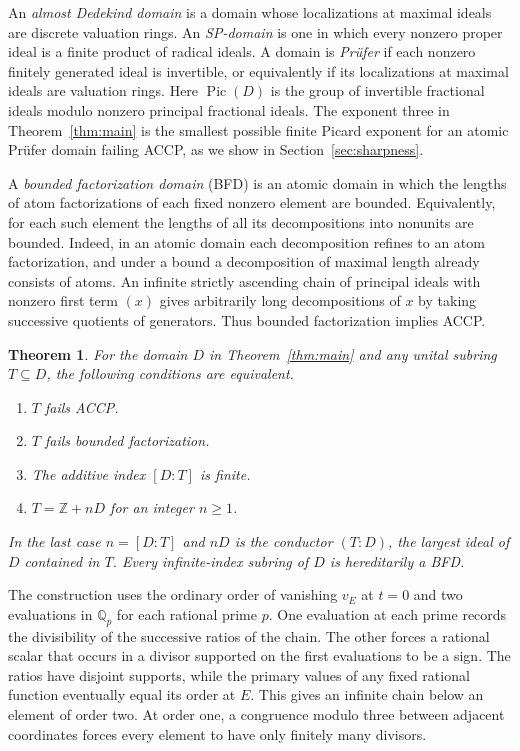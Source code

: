 \documentclass[11pt, letterpaper]{article}
\newtheorem{maintheorem}{Theorem}
\theoremstyle{definition}
\theoremstyle{remark}
\begin{document}
An \emph{almost Dedekind domain} is a domain whose localizations at maximal ideals are discrete valuation rings.
An \emph{SP-domain} is one in which every nonzero proper ideal is a finite product of radical ideals.
A domain is \emph{Pr\"ufer} if each nonzero finitely generated ideal is invertible, or equivalently if its localizations at maximal ideals are valuation rings.
Here $\operatorname{Pic}(D)$ is the group of invertible fractional ideals modulo nonzero principal fractional ideals.
The exponent three in Theorem~\ref{thm:main} is the smallest possible finite Picard exponent for an atomic Pr\"ufer domain failing ACCP, as we show in Section~\ref{sec:sharpness}.

A \emph{bounded factorization domain} (BFD) is an atomic domain in which the lengths of atom factorizations of each fixed nonzero element are bounded.
Equivalently, for each such element the lengths of all its decompositions into nonunits are bounded.
Indeed, in an atomic domain each decomposition refines to an atom factorization, and under a bound a decomposition of maximal length already consists of atoms.
An infinite strictly ascending chain of principal ideals with nonzero first term $(x)$ gives arbitrarily long decompositions of $x$ by taking successive quotients of generators.
Thus bounded factorization implies ACCP.

\begin{maintheorem}
    \label{thm:subrings}
    For the domain $D$ in Theorem~\ref{thm:main} and any unital subring $T \subseteq D$, the following conditions are equivalent.
    \begin{enumerate}
        \item $T$ fails ACCP.
        \item $T$ fails bounded factorization.
        \item The additive index $[D:T]$ is finite.
        \item $T = \mathbb{Z} + nD$ for an integer $n \ge 1$.
    \end{enumerate}
    In the last case $n = [D:T]$ and $nD$ is the conductor $(T:D)$, the largest ideal of $D$ contained in $T$.
    Every infinite-index subring of $D$ is hereditarily a BFD.
\end{maintheorem}

The construction uses the ordinary order of vanishing $v_E$ at $t = 0$ and two evaluations in $\mathbb{Q}_p$ for each rational prime $p$.
One evaluation at each prime records the divisibility of the successive ratios of the chain.
The other forces a rational scalar that occurs in a divisor supported on the first evaluations to be a sign.
The ratios have disjoint supports, while the primary values of any fixed rational function eventually equal its order at $E$.
This gives an infinite chain below an element of order two.
At order one, a congruence modulo three between adjacent coordinates forces every element to have only finitely many divisors.
\end{document}
